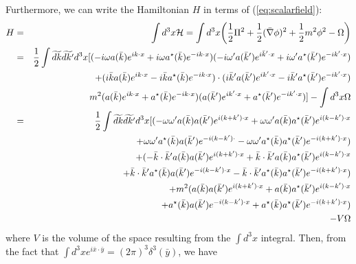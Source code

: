 \documentclass[12pt,epsf]{article}
\def\nolabel{\nonumber }
\def\nolabel{\nonumber }
\begin{document}
Furthermore, we can write the Hamiltonian $H$ in terms of
(\ref{eq:scalarfield}):
\begin{eqnarray}
H &=& \int d^3x\mathcal{H} = \int d^3x\bigg({1\over 2}\Pi^2 + {1\over
2}(\bar \nabla \phi)^2 + {1\over 2}m^2\phi^2 - \Omega \bigg) \nolabel
\\
&=& {1\over 2}\int \widetilde{dk}\widetilde{dk'} d^3x[(-i\omega a(\bar
k) e^{ik\cdot x} + i\omega a^{\star}(\bar k) e^{-ik\cdot x})(-i\omega'
a(\bar k')e^{i\bar k' \cdot x} + i\omega' a^{\star}(\bar
k')e^{-ik'\cdot x}) \nolabel \\
& & + (i\bar k a(\bar k)e^{ik\cdot x} - i\bar k  a^{\star}(\bar
k)e^{-ik\cdot x} ) \cdot (i\bar k' a(\bar k')e^{ik'\cdot x} - i\bar k'
a^{\star}(\bar k')e^{-ik'\cdot x}) \nolabel \\
& & m^2(a(\bar k)e^{ik\cdot x} + a^{\star}(\bar k)e^{-ik\cdot
x})(a(\bar k')e^{ik'\cdot x}+ a^{\star}(\bar k')e^{-ik' \cdot x})] -
\int d^3x \Omega \nolabel \\
&=& {1\over 2} \int \widetilde{dk}\widetilde{dk'}d^3x [(-\omega \omega'
a(\bar k) a(\bar k')e^{i(k+k')\cdot x}+\omega \omega' a(\bar k)
a^{\star}(\bar k') e^{i(k-k')\cdot x} \nolabel \\
& & \qquad \qquad \qquad \;\; + \omega \omega' a^{\star}(\bar k) a(\bar
k')e^{-i(k-k')\cdot} - \omega \omega' a^{\star}(\bar k)a^{\star}(\bar
k')e^{-i(k+k')\cdot x} ) \nolabel \\
& & \qquad \qquad \quad \;\; + (-\bar k\cdot \bar k' a(\bar k)a(\bar
k')e^{i(k+k')\cdot x} + \bar k \cdot \bar k' a(\bar k) a^{\star}(\bar
k') e^{i(k-k')\cdot x} \nolabel \\
& &\qquad \qquad \qquad \;\; + \bar k \cdot \bar k' a^{\star}(\bar
k)a(\bar k')e^{-i(k-k')\cdot x} - \bar k \cdot \bar k'a^{\star}(\bar k)
a^{\star}(\bar k')e^{-i(k+k')\cdot x}) \nolabel \\
& &\qquad \qquad \quad \;\; + m^2(a(\bar k)a(\bar k')e^{i(k+k')\cdot x}
+ a(\bar k)a^{\star}(\bar k')e^{i(k-k')\cdot x} \nolabel \\
& & \qquad \qquad \qquad \;\; + a^{\star}(\bar k)a(\bar
k')e^{-i(k-k')\cdot x} + a^{\star}(\bar k)a^{\star}(\bar
k')e^{-i(k+k')\cdot x} ) \nolabel \\
& & \qquad \qquad \quad \;\; - V\Omega\nolabel
\end{eqnarray}
where $V$ is the volume of the space resulting from the $\int d^3x$
integral.  Then, from the fact that $\int d^3xe^{i\bar x \cdot \bar y}
= (2\pi)^3\delta^3(\bar y )$, we have
\end{document}
